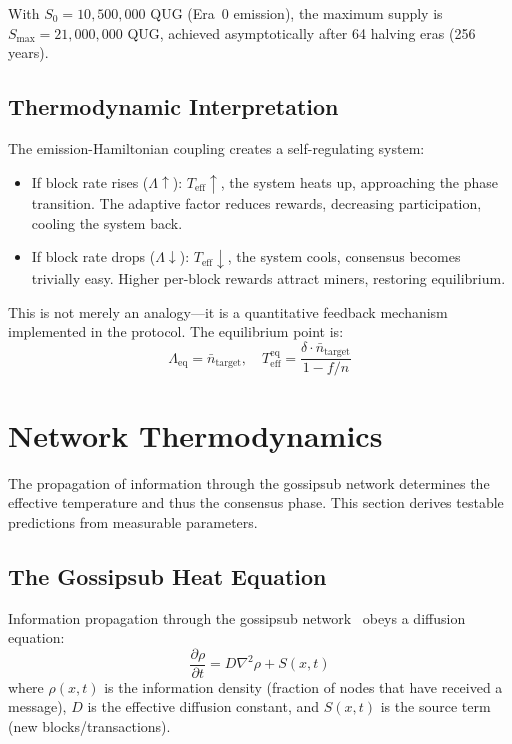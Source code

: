 \documentclass[12pt,a4paper,twocolumn]{article}
\newcommand{\Teff}{T_{\mathrm{eff}}}
\begin{document}
With $S_0 = 10{,}500{,}000$ QUG (Era~0 emission), the maximum supply is $S_{\max} = 21{,}000{,}000$ QUG, achieved asymptotically after 64 halving eras (256 years).

\subsection{Thermodynamic Interpretation}

The emission-Hamiltonian coupling creates a self-regulating system:

\begin{itemize}[leftmargin=*,itemsep=1pt]
\item If block rate rises ($\Lambda \uparrow$): $\Teff \uparrow$, the system heats up, approaching the phase transition. The adaptive factor reduces rewards, decreasing participation, cooling the system back.
\item If block rate drops ($\Lambda \downarrow$): $\Teff \downarrow$, the system cools, consensus becomes trivially easy. Higher per-block rewards attract miners, restoring equilibrium.
\end{itemize}

This is not merely an analogy---it is a quantitative feedback mechanism implemented in the protocol. The equilibrium point is:
\begin{equation}
\Lambda_{\mathrm{eq}} = \bar{n}_{\mathrm{target}}, \quad \Teff^{\mathrm{eq}} = \frac{\delta \cdot \bar{n}_{\mathrm{target}}}{1 - f/n}
\end{equation}

\section{Network Thermodynamics}
\label{sec:network_thermo}

The propagation of information through the gossipsub network determines the effective temperature and thus the consensus phase. This section derives testable predictions from measurable parameters.

\subsection{The Gossipsub Heat Equation}

Information propagation through the gossipsub network~\cite{gossipsub} obeys a diffusion equation:
\begin{equation}
\frac{\partial \rho}{\partial t} = D \nabla^2 \rho + S(x,t)
\end{equation}
where $\rho(x,t)$ is the information density (fraction of nodes that have received a message), $D$ is the effective diffusion constant, and $S(x,t)$ is the source term (new blocks/transactions).
\end{document}
